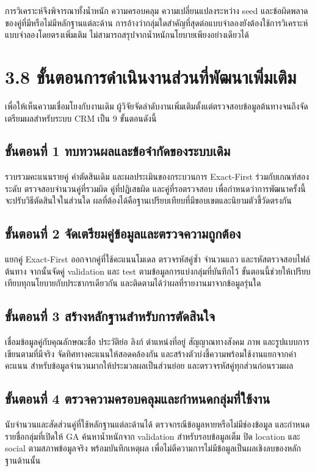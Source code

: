 การวิเคราะห์จึงพิจารณาทั้งน้ำหนัก ความครอบคลุม ความเปลี่ยนแปลงระหว่าง seed และข้อผิดพลาดของคู่ที่มีหรือไม่มีหลักฐานแต่ละด้าน การอ้างว่ากลุ่มใดสำคัญที่สุดต่อแบบจำลองยังต้องใช้การวิเคราะห์แบบจำลองโดยตรงเพิ่มเติม ไม่สามารถสรุปจากน้ำหนักนโยบายเพียงอย่างเดียวได้

\section*{3.8 ขั้นตอนการดำเนินงานส่วนที่พัฒนาเพิ่มเติม}
เพื่อให้เห็นความเชื่อมโยงกับงานเดิม ผู้วิจัยจัดลำดับงานเพิ่มเติมตั้งแต่ตรวจสอบข้อมูลต้นทางจนถึงจัดเตรียมผลสำหรับระบบ CRM เป็น 9 ขั้นตอนดังนี้

\subsection*{ขั้นตอนที่ 1 ทบทวนผลและข้อจำกัดของระบบเดิม}
รวบรวมคะแนนรายคู่ คำตัดสินเดิม และผลประเมินของกระบวนการ Exact-First ร่วมกับเกณฑ์สองระดับ ตรวจสอบจำนวนคู่ที่รวมผิด คู่ที่ปฏิเสธผิด และคู่ที่รอตรวจสอบ เพื่อกำหนดว่าการพัฒนาครั้งนี้จะปรับวิธีตัดสินใจในส่วนใด ผลที่ต้องได้คือฐานเปรียบเทียบที่มีขอบเขตและนิยามตัวชี้วัดตรงกัน

\subsection*{ขั้นตอนที่ 2 จัดเตรียมคู่ข้อมูลและตรวจความถูกต้อง}
แยกคู่ Exact-First ออกจากคู่ที่ใช้คะแนนโมเดล ตรวจรหัสคู่ซ้ำ จำนวนแถว และรหัสตรวจสอบไฟล์ต้นทาง จากนั้นจัดคู่ validation และ test ตามข้อมูลการแบ่งกลุ่มที่บันทึกไว้ ขั้นตอนนี้ช่วยให้เปรียบเทียบทุกนโยบายกับประชากรเดียวกัน และติดตามได้ว่าผลที่รายงานมาจากข้อมูลรุ่นใด

\subsection*{ขั้นตอนที่ 3 สร้างหลักฐานสำหรับการตัดสินใจ}
เชื่อมข้อมูลคู่กับคุณลักษณะชื่อ ประวัติย่อ ลิงก์ ตำแหน่งที่อยู่ สัญญาณทางสังคม ภาพ และรูปแบบการเขียนตามที่มีจริง จัดทิศทางคะแนนให้สอดคล้องกัน และสร้างตัวบ่งชี้ความพร้อมใช้งานแยกจากค่าคะแนน สำหรับข้อมูลจำนวนมากให้ประมวลผลเป็นส่วนย่อย และตรวจรหัสคู่ทุกส่วนก่อนรวมผล

\subsection*{ขั้นตอนที่ 4 ตรวจความครอบคลุมและกำหนดกลุ่มที่ใช้งาน}
นับจำนวนและสัดส่วนคู่ที่ใช้หลักฐานแต่ละด้านได้ ตรวจกรณีข้อมูลหายหรือไม่มีช่องข้อมูล และกำหนดรายชื่อกลุ่มที่เปิดให้ GA ค้นหาน้ำหนักจาก validation สำหรับรอบข้อมูลเต็ม ปิด location และ social ตามสภาพข้อมูลจริง พร้อมบันทึกเหตุผล เพื่อไม่ตีความการไม่มีข้อมูลเป็นผลเชิงลบของหลักฐานด้านนั้น

